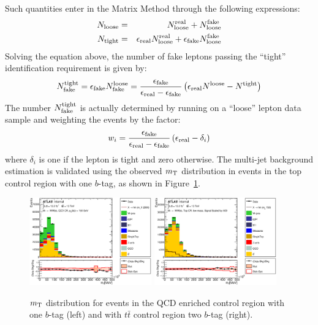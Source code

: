 Such quantities enter in the Matrix Method through the following expressions:
\begin{eqnarray*}
N_{\rm loose} & = & N^{\rm real}_{\rm loose} + N^{\rm fake}_{\rm loose} \\
N_{\rm tight} & = & \epsilon_{\rm real}N^{\rm real}_{\rm loose} + \epsilon_{\rm fake} N^{\rm fake}_{\rm loose}
\end{eqnarray*}
Solving the equation above,  the number of fake leptons passing the ``tight''
identification requirement is given by:
\[
N_{\rm fake}^{\rm tight} = \epsilon_{\rm fake}N^{\rm loose}_{\rm fake} = \frac{\epsilon_{\rm fake}}{\epsilon_{\rm real} - \epsilon_{\rm fake}} \left (\epsilon_{\rm real}N^{\rm loose} - N^{\rm tight} \right)
\]
The number $N_{\rm fake}^{\rm tight}$ is actually determined by running on a
``loose'' lepton data sample and weighting the events by the factor:
\[
w_i = \frac{\epsilon_{\rm fake}}{\epsilon_{\rm real} - \epsilon_{\rm fake}} \left (\epsilon_{\rm real} - 
\delta_i \right)
\]
where $\delta_{i}$ is one if the lepton is tight and zero otherwise.
The multi-jet background estimation is
validated using the observed $m_{\rm T}$ distribution in events in the
top control region with one $b$-tag, as shown in
Figure~\ref{fig:mwt}.
\begin{figure}
\begin{center}
\includegraphics[width=0.47\textwidth, height=0.35\textwidth]{chapters/dihiggs/figures/C_bj1_opt700_bbpt150_wlepmtben.eps}
\includegraphics[width=0.47\textwidth, height=0.35\textwidth]{chapters/dihiggs/figures/ControlPlots/CR1/C_opt700_bbpt150_wlepmtben.eps}
\end{center}
\caption{$m_{\rm T}$ distribution for events in the QCD enriched control region
   with one $b$-tag (left) and with $t\bar{t}$ control region two $b$-tag (right).}
\label{fig:mwt}
\end{figure}







